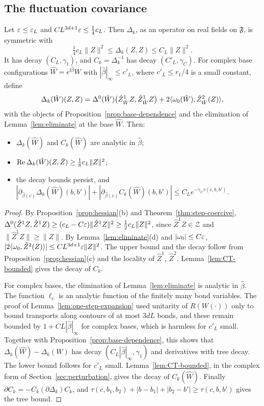 \subsection{The fluctuation covariance}

\begin{corollary}\label{cor:covariance}
Let $\varepsilon\le\varepsilon_L$ and $CL^{3d+1}\varepsilon\le\frac14c_L$. Then $\Delta_k$, as an operator on real fields on $\mathfrak F$, is symmetric with
\[
\tfrac14c_L\|Z\|^2\le\Delta_k(Z,Z)\le C_L\|Z\|^2 .
\]
It has decay $(C_L,\gamma_1)$, and $C_k=\Delta_k^{-1}$ has decay $(C'_L,\gamma_C)$. For complex base configurations $\hat W=e^{\ii\hat\beta}W$ with $|\hat\beta|_\infty\le c'_L$, where $c'_L\le r_1/4$ is a small constant, define
\[
\Delta_k(\hat W)(Z,Z)=\Delta^0(\hat W)\big(\hat Z^1_{\hat W}Z,\hat Z^1_{\hat W}Z\big)+2\langle \omega_0(\hat W),\hat Z^2_{\hat W}(Z)\rangle,
\]
with the objects of Proposition~\ref{prop:base-dependence} and the elimination of Lemma~\ref{lem:eliminate} at the base $\hat W$. Then:
\begin{itemize}
\item $\Delta_k(\hat W)$ and $C_k(\hat W)$ are analytic in $\hat\beta$;
\item $\operatorname{Re}\Delta_k(\hat W)(Z,\bar Z)\ge\frac18c_L\|Z\|^2$;
\item the decay bounds persist, and $|\partial_{\hat\beta(c)}\Delta_k(\hat W)(b,b')|+|\partial_{\hat\beta(c)}C_k(\hat W)(b,b')|\le C_Le^{-\gamma_C\tau(c,b,b')}$.
\end{itemize}
\end{corollary}

\begin{proof}
By Proposition~\ref{prop:hessian}(b) and Theorem~\ref{thm:step-coercive}, $\Delta^0(\hat Z^1Z,\hat Z^1Z)\ge(c_L-C\varepsilon)\|\hat Z^1Z\|^2\ge\frac12c_L\|Z\|^2$, since $\hat Z^1Z\in\mathcal Z$ and $\|\hat Z^1Z\|\ge\|Z\|$. By Lemma~\ref{lem:eliminate}(d) and $|\omega_0|\le C\varepsilon$, $|2\langle \omega_0,\hat Z^2(Z)\rangle|\le CL^{3d+1}\varepsilon\|Z\|^2$. The upper bound and the decay follow from Proposition~\ref{prop:hessian}(c) and the locality of $\hat Z^1$, $\hat Z^2$. Lemma~\ref{lem:CT-bounded} gives the decay of $C_k$.

For complex bases, the elimination of Lemma~\ref{lem:eliminate} is analytic in $\hat\beta$. The function $\ell_c$ is an analytic function of the finitely many bond variables. The proof of Lemma~\ref{lem:one-step-expansion} used unitarity of $R(W(\cdot))$ only to bound transports along contours of at most $3dL$ bonds, and these remain bounded by $1+CL|\hat\beta|_\infty$ for complex bases, which is harmless for $c'_L$ small. Together with Proposition~\ref{prop:base-dependence}, this shows that $\Delta_k(\hat W)-\Delta_k(W)$ has decay $(C_L|\hat\beta|_\infty,\gamma_1)$ and derivatives with tree decay. The lower bound follows for $c'_L$ small. Lemma~\ref{lem:CT-bounded}, in the complex form of Section~\ref{sec:perturbation}, gives the decay of $C_k(\hat W)$. Finally $\partial C_k=-C_k(\partial\Delta_k)C_k$, and $\tau(c,b_1,b_2)+|b-b_1|+|b_2-b'|\ge\tau(c,b,b')$ gives the tree bound.
\end{proof}

